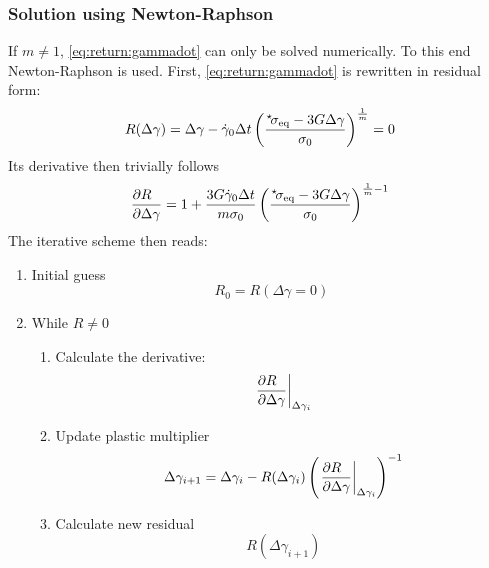 \documentclass[times,namecite]{goose-article}
\newcommand\leftstar[1]{\hspace*{-.3em}~^\star\!#1}
\begin{document}
\subsubsection{Solution using Newton-Raphson}

If $m \neq 1$, \eqref{eq:return:gammadot} can only be solved numerically. To this end Newton-Raphson is used. First, \eqref{eq:return:gammadot} is rewritten in residual form:
\begin{equation}
  R ( \Delta \gamma )
  =
  \Delta \gamma - \dot{\gamma}_0 \Delta t
  \left(
    \frac{
      \leftstar{\sigma}_\mathrm{eq} - 3 G \Delta \gamma
    }{
      \sigma_0
    }
  \right)^{\frac{1}{m}}
  =
  0
\end{equation}
Its derivative then trivially follows
\begin{equation}
  \frac{\partial R \hfill}{\partial \Delta \gamma \hfill} =
  1 + \frac{ 3 G \dot{\gamma}_0 \Delta t }{m \sigma_0}
  \left(
    \frac{
      \leftstar{\sigma}_\mathrm{eq} - 3 G \Delta \gamma
    }{
      \sigma_0
    }
  \right)^{\frac{1}{m}-1}
\end{equation}
The iterative scheme then reads:

\begin{enumerate}
%
\item Initial guess
\begin{equation}
  R_0 = R ( \Delta \gamma = 0 )
\end{equation}
%
\item While \(R \neq 0\)
%
\begin{enumerate}
%
\item Calculate the derivative:
\begin{equation}
\left.
    \frac{\partial R \hfill}{\partial \Delta \gamma \hfill}
    \right|_{\Delta \gamma_i}
\end{equation}
%
\item Update plastic multiplier
\begin{equation}
  \Delta \gamma_{i+1} = \Delta \gamma_i -
  R(\Delta \gamma_i)
  \left( \left.
    \frac{\partial R \hfill}{\partial \Delta \gamma \hfill}
  \right|_{\Delta \gamma_i} \right)^{-1}
\end{equation}
%
\item Calculate new residual
\begin{equation}
  R( \Delta \gamma_{i+1} )
\end{equation}
%
\end{enumerate}
%
\end{enumerate}
\end{document}
